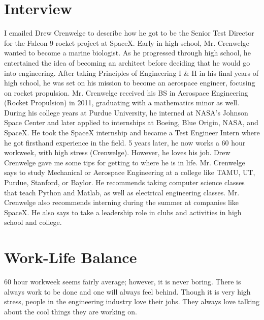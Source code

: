 \begin{multicols}{2}
\section{Interview}
        I emailed Drew Crenwelge to describe how he got to be the Senior Test Director for the Falcon 9 rocket project at SpaceX. Early in high school, Mr. Crenwelge wanted to become a marine biologist. As he progressed through high school, he entertained the idea of becoming an architect before deciding that he would go into engineering. After taking Principles of Engineering I \& II in his final years of high school, he was set on his mission to become an aerospace engineer, focusing on rocket propulsion. Mr. Crenwelge received his BS in Aerospace Engineering (Rocket Propulsion) in 2011, graduating with a mathematics minor as well. During his college years at Purdue University, he interned at NASA’s Johnson Space Center and later applied to internships at Boeing, Blue Origin, NASA, and SpaceX. He took the SpaceX internship and became a Test Engineer Intern where he got firsthand experience in the field. 5 years later, he now works a 60 hour workweek, with high stress (Crenwelge). However, he loves his job. 
        Drew Crenwelge gave me some tips for getting to where he is in life. Mr. Crenwelge says to study Mechanical or Aerospace Engineering at a college like TAMU, UT, Purdue, Stanford, or Baylor. He recommends taking computer science classes that teach Python and Matlab, as well as electrical engineering classes. Mr. Crenwelge also recommends interning during the summer at companies like SpaceX. He also says to take a leadership role in clubs and activities in high school and college. 
\section{Work-Life Balance}
    60 hour workweek seems fairly average; however, it is never boring. There is always work to be done and one will always feel behind. 
    Though it is very high stress, people in the engineering industry love their jobs. They always love talking about the cool things they are working on.
\end{multicols}